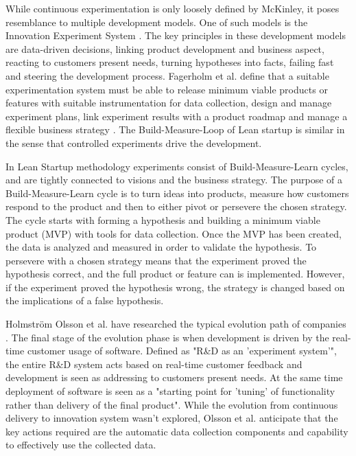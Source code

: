 \documentclass[english]{tktltiki2}
\theoremstyle{definition}
\theoremstyle{remark}
\begin{document}
While continuous experimentation is only loosely defined by McKinley, it poses resemblance to multiple development models. One of such models is the Innovation Experiment System \cite{bosch2012building}. The key principles in these development models are data-driven decisions, linking product development and business aspect, reacting to customers present needs, turning hypotheses into facts, failing fast and steering the development process. Fagerholm et al. define that a suitable experimentation system must be able to release minimum viable products or features with suitable instrumentation for data collection, design and manage experiment plans, link experiment results with a product roadmap and manage a flexible business strategy \cite{fagerholm2014building}. The Build-Measure-Loop of Lean startup is similar in the sense that controlled experiments drive the development.

In Lean Startup methodology \cite{ries2011lean} experiments consist of Build-Measure-Learn cycles, and are tightly connected to visions and the business strategy. The purpose of a Build-Measure-Learn cycle is to turn ideas into products, measure how customers respond to the product and then to either pivot or persevere the chosen strategy. The cycle starts with forming a hypothesis and building a minimum viable product (MVP) with tools for data collection. Once the MVP has been created, the data is analyzed and measured in order to validate the hypothesis. To persevere with a chosen strategy means that the experiment proved the hypothesis correct, and the full product or feature can is implemented. However, if the experiment proved the hypothesis wrong, the strategy is changed based on the implications of a false hypothesis.

Holmström Olsson et al. have researched the typical evolution path of companies \cite{olsson2012climbing}. The final stage of the evolution phase is when development is driven by the real-time customer usage of software. Defined as "R\&D as an 'experiment system'", the entire R\&D system acts based on real-time customer feedback and development is seen as addressing to customers present needs. At the same time deployment of software is seen as a "starting point for 'tuning' of functionality rather than delivery of the final product". While the evolution from continuous delivery to innovation system wasn't explored, Olsson et al. anticipate that the key actions required are the automatic data collection components and capability to effectively use the collected data.
\end{document}

